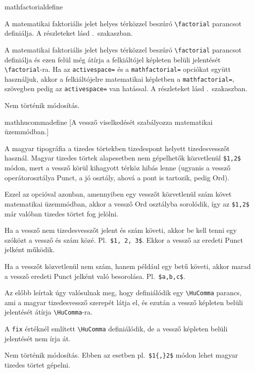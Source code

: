 \documentclass[12pt]{article}
\begin{document}
\begin{description}
\begin{hunopt}{mathfactorial}{define}
\item[define]
A matematikai faktoriális jelet helyes térközzel beszúró \verb|\factorial| parancsot definiálja.
A részleteket lásd .~szakaszban.
\item[fix]
A matematikai faktoriális jelet helyes térközzel beszúró \verb|\factorial| parancsot definiálja és ezen felül még átírja a felkiáltójel képleten belüli jelentését \verb|\factorial|-ra.
Ha az \texttt{activespace=} és a \texttt{mathfactorial=} opciókat együtt használjuk, akkor a felkiáltójelre matematikai képletben a \texttt{mathfactorial=}, szövegben pedig az \texttt{activespace=} van hatással.
A részleteket lásd .~szakaszban.
\item[unchanged]
Nem történik módosítás.
\end{hunopt}

\begin{hunopt}{mathhucomma}{define}
[A vessző viselkedését szabályozza matematikai üzemmódban.]
\item[fix]
A magyar tipográfia a tizedes törtekben tizedespont helyett tizedesvesszőt használ. Magyar tizedes törtek alapesetben nem gépelhetők közvetlenül \verb|$1,2$| módon, mert a vessző körül kihagyott térköz hibás lenne (ugyanis a vessző operátorosztálya Punct, a jó osztály, ahová a pont is tartozik, pedig Ord).

Ezzel az opcióval azonban, amennyiben egy vesszőt közvetlenül szám követ matematikai üzemmódban, akkor a vessző Ord osztályba sorolódik, így az \verb|$1,2$| már valóban tizedes törtet fog jelölni.

Ha a vessző nem tizedesvesszőt jelent és szám követi, akkor be kell tenni egy szóközt a vessző és szám közé.
Pl.~\verb|$1, 2, 3$|.
Ekkor a vessző az eredeti Punct jelként működik.

Ha a vesszőt közvetlenül nem szám, hanem például egy betű követi, akkor marad a vessző eredeti Punct jelként való besorolása.
Pl.~\verb|$a,b,c$|.

Az előbb leírtak úgy valósulnak meg, hogy definiálódik egy \verb|\HuComma| parancs, ami a magyar tizedesvessző szerepét látja el, és ezután a vessző képleten belüli jelentését átírja \verb|\HuComma|-ra.
\item[define]
A \texttt{fix} értéknél említett \verb|\HuComma| definiálódik, de a vessző képleten belüli jelentését nem írja át.
\item[unchanged]
Nem történik módosítás.
Ebben az esetben pl.~\verb|$1{,}2$| módon lehet magyar tizedes törtet gépelni.
\end{hunopt}


\end{description}
\end{document}
